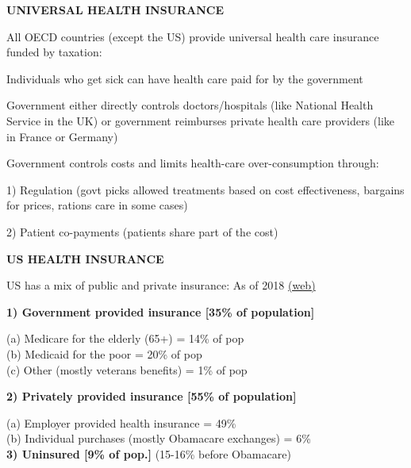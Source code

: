 \documentclass[landscape]{slides}
\begin{document}
\begin{slide}

\end{slide}

\begin{slide}
\begin{center}
{\bf UNIVERSAL HEALTH INSURANCE}
\end{center}

All OECD countries (except the US) provide universal health care insurance funded by taxation:

Individuals who get sick can have health care paid for by the government

Government either directly controls doctors/hospitals (like National Health Service in the UK)
or government reimburses private health care providers (like in France or Germany)

Government controls costs and limits health-care over-consumption through:

1) Regulation (govt picks allowed treatments based on cost effectiveness, bargains for prices, rations care in some cases)

2) Patient co-payments (patients share part of the cost)

\end{slide}



\begin{slide}
\begin{center}
{\bf US HEALTH INSURANCE}
\end{center}
US has a mix of public and private insurance: As of 2018
\href{http://kff.org/other/state-indicator/total-population/}{(web)}

\textbf{1) Government provided insurance [35\% of population]}

(a) Medicare for the elderly (65+) = 14\% of pop \\
(b) Medicaid for the poor = 20\% of pop \\
(c) Other (mostly veterans benefits) = 1\% of pop

\textbf{2) Privately provided insurance [55\% of population]}

(a) Employer provided health insurance = 49\%  \\
(b) Individual purchases (mostly Obamacare exchanges) = 6\% \\

\textbf{3) Uninsured [9\% of pop.]} (15-16\% before Obamacare)


\end{slide}
\end{document}
